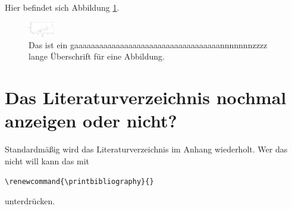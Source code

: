 \documentclass[
  doc,floatsintext]{apa7}
\begin{document}
Hier befindet sich Abbildung \ref{fig:plotcar2}.

\begin{figure}
\includegraphics[width=0.1\textwidth]{apa7vorlage_files/figure-latex/plotcar2-1} \caption{Das ist ein gaaaaaaaaaaaaaaaaaaaaaaaaaaaaaaaaaaannnnnnnzzzz lange Überschrift für eine Abbildung.}\label{fig:plotcar2}
\end{figure}

\hypertarget{das-literaturverzeichnis-nochmal-anzeigen-oder-nicht}{%
\section{Das Literaturverzeichnis nochmal anzeigen oder nicht?}\label{das-literaturverzeichnis-nochmal-anzeigen-oder-nicht}}

Standardmäßig wird das Literaturverzeichnis im Anhang wiederholt. Wer das nicht will kann das mit

\texttt{\textbackslash{}renewcommand\{\textbackslash{}printbibliography\}\{\}}

unterdrücken.

\renewcommand{\printbibliography}{}


\printbibliography

\clearpage
\renewcommand{\listfigurename}{Figure captions}

\clearpage
\renewcommand{\listtablename}{Table captions}
\end{document}
